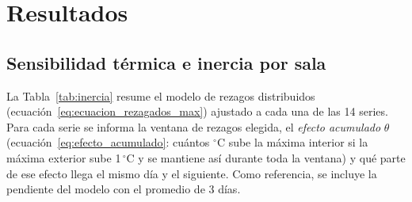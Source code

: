 \documentclass[11pt,a4paper]{article}
\begin{document}
\section{Resultados}

\subsection{Sensibilidad térmica e inercia por sala}
La Tabla~\ref{tab:inercia} resume el modelo de rezagos distribuidos (ecuación~\ref{eq:ecuacion_rezagados_max}) ajustado a cada una de las 14 series. Para cada serie se informa la ventana de rezagos elegida, el \textit{efecto acumulado} $\theta$ (ecuación~\ref{eq:efecto_acumulado}: cuántos $^\circ$C sube la máxima interior si la máxima exterior sube 1\,$^\circ$C y se mantiene así durante toda la ventana) y qué parte de ese efecto llega el mismo día y el siguiente. Como referencia, se incluye la pendiente del modelo con el promedio de 3 días.
\end{document}
